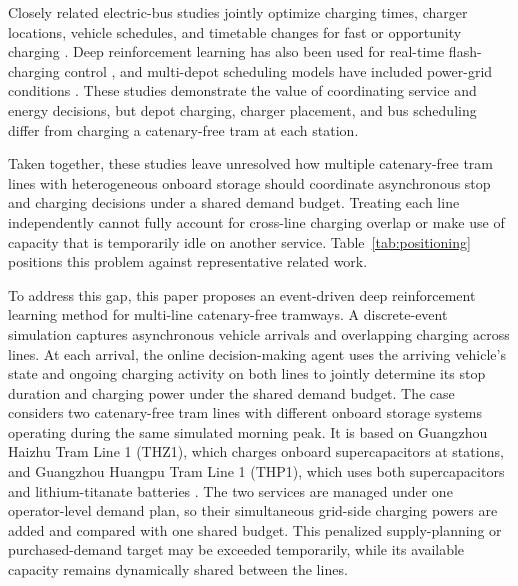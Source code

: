 \documentclass[conference]{IEEEtran}
\newcommand{\thz}{THZ1}
\newcommand{\thp}{THP1}
\begin{document}
Closely related electric-bus studies jointly optimize charging times, charger locations, vehicle schedules, and timetable changes for fast or opportunity charging \cite{he2020charging,hu2022joint,li2023cooperative,duan2023integrated}. Deep reinforcement learning has also been used for real-time flash-charging control \cite{bi2024realtime}, and multi-depot scheduling models have included power-grid conditions \cite{wu2022multidepot}. These studies demonstrate the value of coordinating service and energy decisions, but depot charging, charger placement, and bus scheduling differ from charging a catenary-free tram at each station.

Taken together, these studies leave unresolved how multiple catenary-free tram lines with heterogeneous onboard storage should coordinate asynchronous stop and charging decisions under a shared demand budget. Treating each line independently cannot fully account for cross-line charging overlap or make use of capacity that is temporarily idle on another service. Table~\ref{tab:positioning} positions this problem against representative related work.

To address this gap, this paper proposes an event-driven deep reinforcement learning method for multi-line catenary-free tramways. A discrete-event simulation captures asynchronous vehicle arrivals and overlapping charging across lines. At each arrival, the online decision-making agent uses the arriving vehicle's state and ongoing charging activity on both lines to jointly determine its stop duration and charging power under the shared demand budget. The case considers two catenary-free tram lines with different onboard storage systems operating during the same simulated morning peak. It is based on Guangzhou Haizhu Tram Line 1 (\thz), which charges onboard supercapacitors at stations, and Guangzhou Huangpu Tram Line 1 (\thp), which uses both supercapacitors and lithium-titanate batteries \cite{haizhu_wiki,haizhu_baike,huangpu_wiki,huangpu_sasac}. The two services are managed under one operator-level demand plan, so their simultaneous grid-side charging powers are added and compared with one shared budget. This penalized supply-planning or purchased-demand target may be exceeded temporarily, while its available capacity remains dynamically shared between the lines.
\end{document}
